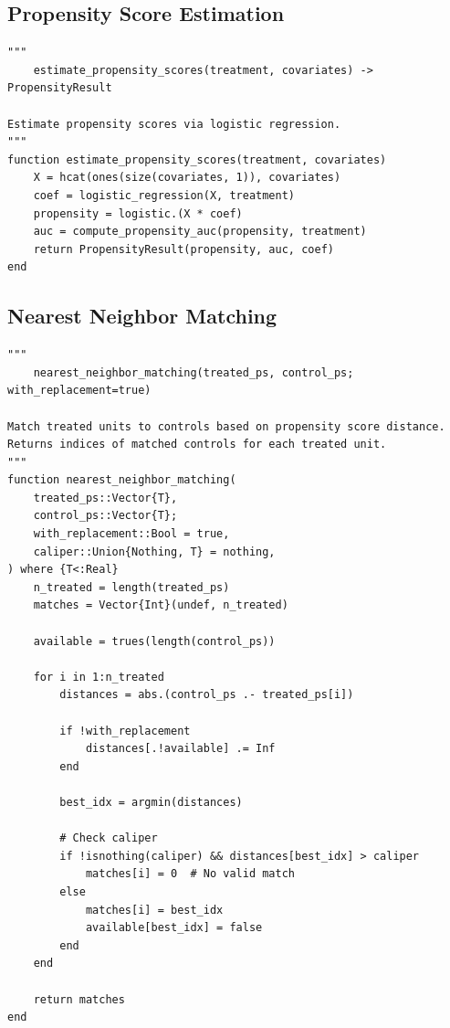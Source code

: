 \subsection{Propensity Score Estimation}

\begin{verbatim}
"""
    estimate_propensity_scores(treatment, covariates) -> PropensityResult

Estimate propensity scores via logistic regression.
"""
function estimate_propensity_scores(treatment, covariates)
    X = hcat(ones(size(covariates, 1)), covariates)
    coef = logistic_regression(X, treatment)
    propensity = logistic.(X * coef)
    auc = compute_propensity_auc(propensity, treatment)
    return PropensityResult(propensity, auc, coef)
end
\end{verbatim}

\subsection{Nearest Neighbor Matching}

\begin{verbatim}
"""
    nearest_neighbor_matching(treated_ps, control_ps; with_replacement=true)

Match treated units to controls based on propensity score distance.
Returns indices of matched controls for each treated unit.
"""
function nearest_neighbor_matching(
    treated_ps::Vector{T},
    control_ps::Vector{T};
    with_replacement::Bool = true,
    caliper::Union{Nothing, T} = nothing,
) where {T<:Real}
    n_treated = length(treated_ps)
    matches = Vector{Int}(undef, n_treated)

    available = trues(length(control_ps))

    for i in 1:n_treated
        distances = abs.(control_ps .- treated_ps[i])

        if !with_replacement
            distances[.!available] .= Inf
        end

        best_idx = argmin(distances)

        # Check caliper
        if !isnothing(caliper) && distances[best_idx] > caliper
            matches[i] = 0  # No valid match
        else
            matches[i] = best_idx
            available[best_idx] = false
        end
    end

    return matches
end
\end{verbatim}

